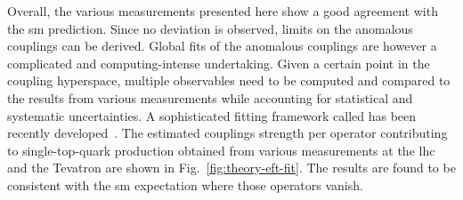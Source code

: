 
Overall, the various measurements presented here show a good agreement with the \gls{sm} prediction. Since no deviation is observed, limits on the anomalous couplings can be derived. Global fits of the anomalous couplings are however a complicated and computing-intense undertaking. Given a certain point in the coupling hyperspace, multiple observables need to be computed and compared to the results from various measurements while accounting for statistical and systematic uncertainties. A sophisticated fitting framework called \TOPFITTER[format=hyperbf] has been recently developed~\cite{Buckley:2015lku}. The estimated couplings strength per operator contributing to single-top-quark production obtained from various measurements at the \gls{lhc} and the Tevatron are shown in Fig.~\ref{fig:theory-eft-fit}. The results are found to be consistent with the \gls{sm} expectation where those operators vanish.

